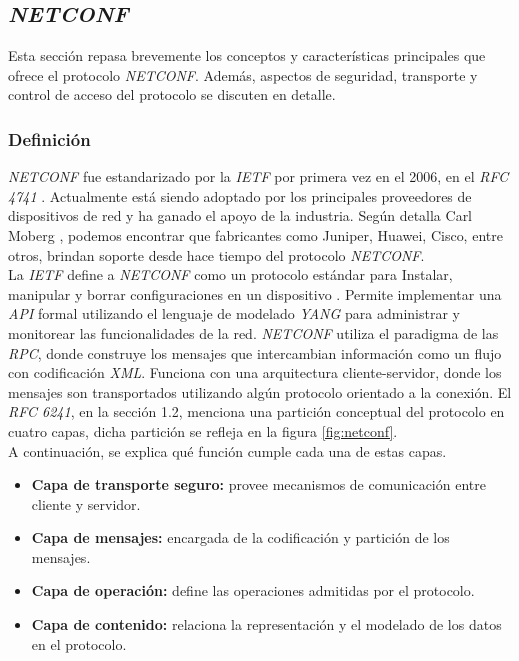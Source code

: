 \subsection{\textit{NETCONF}}
Esta sección repasa brevemente los conceptos y características principales que ofrece el protocolo \textit{NETCONF}. Además, aspectos de seguridad, transporte y control de acceso del protocolo se discuten en detalle. 

\subsubsection{Definición}
\textit{NETCONF} fue estandarizado por la \textit{IETF} por primera vez en el 2006, en el \textit{RFC 4741} \parencite{netconfrfc}. Actualmente está siendo adoptado por los principales proveedores de dispositivos de red y ha ganado el apoyo de la industria. Según detalla Carl Moberg \parencite{netconfusos}, podemos encontrar que fabricantes como Juniper, Huawei, Cisco, entre otros, brindan soporte desde hace tiempo del protocolo \textit{NETCONF}. 
\\

La \textit{IETF} define a \textit{NETCONF} como un protocolo estándar para Instalar, manipular y borrar configuraciones en un dispositivo \parencite{netconfrfcnuevo}. Permite implementar una \textit{API} formal utilizando el lenguaje de modelado \textit{YANG} para administrar y monitorear las funcionalidades de la red. \textit{NETCONF} utiliza el paradigma de las \textit{RPC}, donde construye los mensajes que intercambian información como un flujo con codificación \textit{XML}. Funciona con una arquitectura cliente-servidor, donde los mensajes son transportados utilizando algún protocolo orientado a la conexión. El \textit{RFC 6241}, en la sección 1.2, menciona una partición conceptual del protocolo en cuatro capas, dicha partición se refleja en la figura \ref{fig:netconf}. 
\\

A continuación, se explica qué función cumple cada una de estas capas.

\begin{itemize}
	\item \textbf{Capa de transporte seguro:} provee mecanismos de comunicación entre cliente y servidor.  
	\item \textbf{Capa de mensajes:} encargada de la codificación y partición de los mensajes.  
	\item \textbf{Capa de operación:} define las operaciones admitidas por el protocolo.
	\item \textbf{Capa de contenido:} relaciona la representación y el modelado de los datos en el protocolo.    
\end{itemize}


